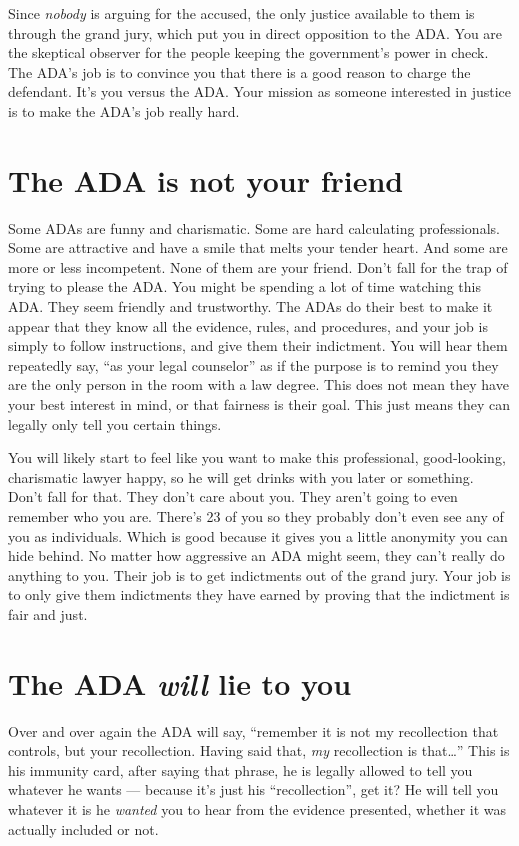 \documentclass[letterpaper]{article}
\begin{document}
Since \emph{nobody} is arguing for the accused, the only justice available to them is through the grand jury, which put you in direct opposition to the ADA.
You are the skeptical observer for the people keeping the government's power in check. 
The ADA's job is to convince you that there is a good reason to charge the defendant. 
It's you versus the ADA. 
Your mission as someone interested in justice is to make the ADA's job really hard.

\section*{The ADA is not your friend}
Some ADAs are funny and charismatic. 
Some are hard calculating professionals. 
Some are attractive and have a smile that melts your tender heart. 
And some are more or less incompetent. 
None of them are your friend. 
Don't fall for the trap of trying to please the ADA. 
You might be spending a lot of time watching this ADA.
They seem friendly and trustworthy. 
The ADAs do their best to make it appear that they know all the evidence, rules, and procedures, and your job is simply to follow instructions, and give them their indictment. 
You will hear them repeatedly say, ``as your legal counselor'' as if the purpose is to remind you they are the only person in the room with a law degree. 
This does not mean they have your best interest in mind, or that fairness is their goal. 
This just means they can legally only tell you certain things. 

You will likely start to feel like you want to make this professional, good-looking, charismatic lawyer happy, so he will get drinks with you later or something. 
Don't fall for that. 
They don't care about you. They aren't going to even remember who you are. 
There's 23 of you so they probably don't even see any of you as individuals.
Which is good because it gives you a little anonymity you can hide behind. No matter how aggressive an ADA might seem, they can't really do anything to you.
Their job is to get indictments out of the grand jury. 
Your job is to only give them indictments they have earned by proving that the indictment is fair and just.

\section*{The ADA \emph{will} lie to you}
Over and over again the ADA will say, ``remember it is not my recollection that controls, but your recollection.  Having said that, \emph{my} recollection is that\ldots''
This is his immunity card, after saying that phrase, he is legally allowed to tell you whatever he wants --- because it's just his ``recollection'', get it?
He will tell you whatever it is he \emph{wanted} you to hear from the evidence presented, whether it was actually included or not. 
\end{document}
